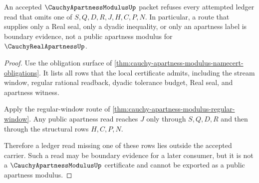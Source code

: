 \begin{theorem}
\label{thm:cauchy-apartness-modulus-ledger-refusal}
An accepted $\CauchyApartnessModulusUp$ packet refuses every attempted ledger read that omits one of $S,Q,D,R,J,H,C,P,N$. In particular, a route that supplies only a Real seal, only a dyadic inequality, or only an apartness label is boundary evidence, not a public apartness modulus for $\CauchyRealApartnessUp$.
\end{theorem}
\begin{proof}
Use the obligation surface of \autoref{thm:cauchy-apartness-modulus-namecert-obligations}. It lists all rows that the local certificate admits, including the stream window, regular rational readback, dyadic tolerance budget, Real seal, and apartness witness.

Apply the regular-window route of \autoref{thm:cauchy-apartness-modulus-regular-window}. Any public apartness read reaches $J$ only through $S,Q,D,R$ and then through the structural rows $H,C,P,N$.

Therefore a ledger read missing one of these rows lies outside the accepted carrier. Such a read may be boundary evidence for a later consumer, but it is not a $\CauchyApartnessModulusUp$ certificate and cannot be exported as a public apartness modulus.
\end{proof}




